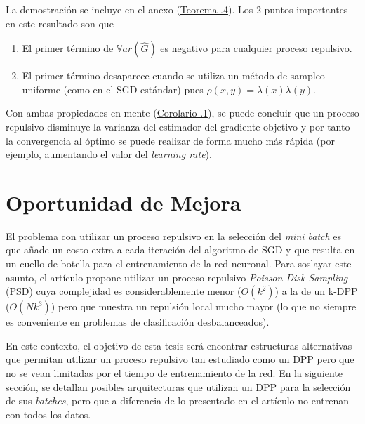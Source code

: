 La demostración se incluye en el anexo (\hyperlink{Teorema .4}{Teorema .4}). Los 2 puntos importantes en este resultado son que 
\begin{enumerate}
    \item El primer término de $\mathbb{V}ar(\hat{G})$ es negativo para cualquier proceso repulsivo.
    \item El primer término desaparece cuando se utiliza un método de sampleo uniforme (como en el SGD estándar) pues $\rho(x,y) = \lambda(x)\lambda(y)$. 
\end{enumerate}

Con ambas propiedades en mente (\hyperlink{Corolario .1}{Corolario .1}), se puede concluir que un proceso repulsivo disminuye la varianza del estimador del gradiente objetivo y por tanto la convergencia al óptimo se puede realizar de forma mucho más rápida (por ejemplo, aumentando el valor del \textit{learning rate}).

\section{Oportunidad de Mejora}

El problema con utilizar un proceso repulsivo en la selección del \textit{mini batch} es que añade un costo extra a cada iteración del algoritmo de SGD y que resulta en un cuello de botella para el entrenamiento de la red neuronal. Para soslayar este asunto, el artículo \cite{https://doi.org/10.48550/arxiv.1804.02772} propone utilizar un proceso repulsivo \textit{Poisson Disk Sampling} (PSD) cuya complejidad es considerablemente menor ($O(k^2)$) a la de un k-DPP ($O(Nk^3)$) pero que muestra un repulsión local mucho mayor \cite{Biscio_2016} (lo que no siempre es conveniente en problemas de clasificación desbalanceados). 


\vspace{0.2cm}

En este contexto, el objetivo de esta tesis será encontrar estructuras alternativas que permitan utilizar un proceso repulsivo tan estudiado como un DPP pero que no se vean limitadas por el tiempo de entrenamiento de la red. En la siguiente sección, se detallan posibles arquitecturas que utilizan un DPP para la selección de sus \textit{batches}, pero que a diferencia de lo presentado en el artículo \cite{https://doi.org/10.48550/arxiv.1804.02772} no entrenan con todos los datos. 





